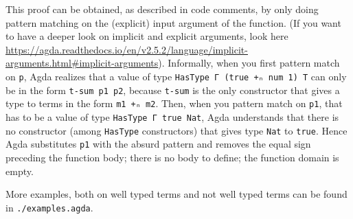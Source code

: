 \documentclass{article}
\begin{document}
This proof can be obtained, as described in code comments, by only doing pattern matching on the (explicit) input argument of the function. (If you want to have a deeper look on implicit and explicit arguments, look here \url{https://agda.readthedocs.io/en/v2.5.2/language/implicit-arguments.html#implicit-arguments}).
Informally, when you first pattern match on \texttt{p}, Agda realizes that a value of type \texttt{HasType Γ (true +ₙ num 1) T} can only be in the form \texttt{t-sum p1 p2}, because \texttt{t-sum} is the only constructor that gives a type to terms in the form \texttt{m1 +ₙ m2}.
Then, when you pattern match on \texttt{p1}, that has to be a value of type \texttt{HasType Γ true Nat}, Agda understands that there is no constructor (among \texttt{HasType} constructors) that gives type \texttt{Nat} to \texttt{true}.
Hence Agda substitutes \texttt{p1} with the absurd pattern and removes the equal sign preceding the function body; there is no body to define; the function domain is empty.

\vspace{1em}
More examples, both on well typed terms and not well typed terms can be found in \texttt{./examples.agda}.



\newpage
\nocite{*}
\printbibliography
\end{document}
